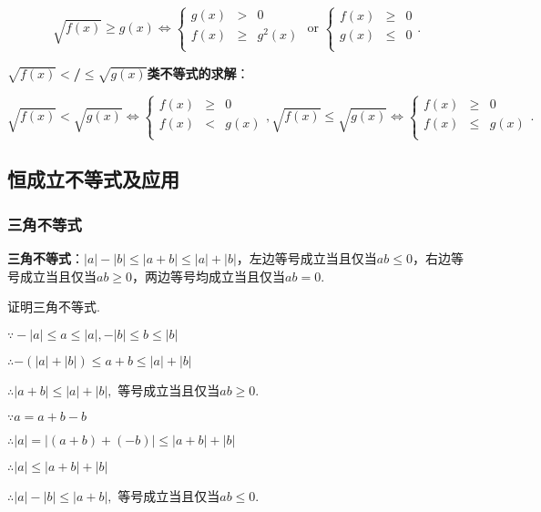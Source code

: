 \documentclass[8pt]{article}
\begin{document}
				$$
				\sqrt{f(x)}\geq g(x)
				\Leftrightarrow
				\left\{
				\begin{array}{rcl}
				g(x)&>&0\\
				f(x)&\geq&g^2(x)\\
				\end{array}
				\right.
				\text{ or }
				\left\{
				\begin{array}{rcl}
				f(x)&\geq&0\\
				g(x)&\leq&0\\
				\end{array}
				\right..
				$$

				\textbf{$\sqrt{f(x)}$$<$/$\leq$$\sqrt{g(x)}$类不等式的求解}：

				$$
				\sqrt{f(x)}<\sqrt{g(x)}
				\Leftrightarrow
				\left\{
				\begin{array}{rcl}
				f(x)&\geq&0\\
				f(x)&<&g(x)\\
				\end{array}
				\right.,
				\sqrt{f(x)}\leq\sqrt{g(x)}
				\Leftrightarrow
				\left\{
				\begin{array}{rcl}
				f(x)&\geq&0\\
				f(x)&\leq&g(x)\\
				\end{array}
				\right..
				$$

		\newpage
		\subsection{恒成立不等式及应用}
			\subsubsection{三角不等式}
				\textbf{三角不等式}：$|a|-|b|\leq|a+b|\leq|a|+|b|$，左边等号成立当且仅当$ab\leq 0$，右边等号成立当且仅当$ab\geq 0$，两边等号均成立当且仅当$ab=0$.

				证明三角不等式.

				$\because -|a|\leq a\leq |a|, -|b|\leq b\leq |b|$

				$\therefore -(|a|+|b|)\leq a+b\leq |a|+|b|$

				$\therefore |a+b|\leq|a|+|b|,$ 等号成立当且仅当$ab\geq 0.$

				$\because a=a+b-b$

				$\therefore |a|=|(a+b)+(-b)|\leq |a+b|+|b|$

				$\therefore |a|\leq|a+b|+|b|$

				$\therefore |a|-|b|\leq|a+b|,$ 等号成立当且仅当$ab\leq 0.$
\end{document}
